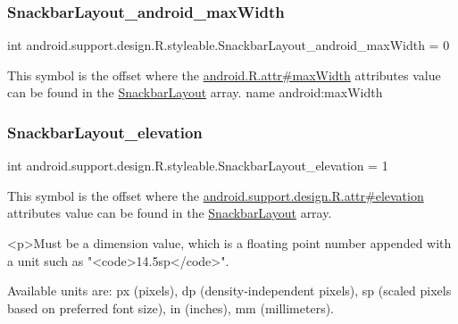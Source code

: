 \subsubsection{\texorpdfstring{Snackbar\+Layout\+\_\+android\+\_\+max\+Width}{SnackbarLayout\_android\_maxWidth}}
{\footnotesize\ttfamily int android.\+support.\+design.\+R.\+styleable.\+Snackbar\+Layout\+\_\+android\+\_\+max\+Width = 0\hspace{0.3cm}{\ttfamily [static]}}

This symbol is the offset where the \hyperlink{}{android.\+R.\+attr\#max\+Width} attribute\textquotesingle{}s value can be found in the \hyperlink{classandroid_1_1support_1_1design_1_1R_1_1styleable_ade77d86fa8e689770b5436467abdc2db}{Snackbar\+Layout} array.  name android\+:max\+Width \mbox{\label{classandroid_1_1support_1_1design_1_1R_1_1styleable_ab3ccaab6fd75451ae24c27558c096f8a}} 
\subsubsection{\texorpdfstring{Snackbar\+Layout\+\_\+elevation}{SnackbarLayout\_elevation}}
{\footnotesize\ttfamily int android.\+support.\+design.\+R.\+styleable.\+Snackbar\+Layout\+\_\+elevation = 1\hspace{0.3cm}{\ttfamily [static]}}

This symbol is the offset where the \hyperlink{classandroid_1_1support_1_1design_1_1R_1_1attr_a5089b576eabe15b5d530b536c68a760d}{android.\+support.\+design.\+R.\+attr\#elevation} attribute\textquotesingle{}s value can be found in the \hyperlink{classandroid_1_1support_1_1design_1_1R_1_1styleable_ade77d86fa8e689770b5436467abdc2db}{Snackbar\+Layout} array.

\begin{DoxyVerb}      <p>Must be a dimension value, which is a floating point number appended with a unit such as "<code>14.5sp</code>".
\end{DoxyVerb}
 Available units are\+: px (pixels), dp (density-\/independent pixels), sp (scaled pixels based on preferred font size), in (inches), mm (millimeters). 

